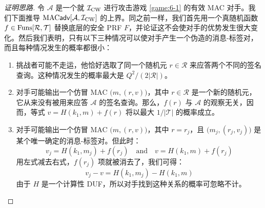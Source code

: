 \begin{proof}[证明思路]
令 $\mathcal{A}$ 是一个就 $\mathcal{I}_{\rm CW}$ 进行攻击游戏 \ref{game:6-1} 的有效 MAC 对手。我们下面推导 ${\rm MAC}\mathsf{adv}[\mathcal{A},\mathcal{I}_{\rm CW}]$ 的上界。同之前一样，我们首先用一个真随机函数 $f\in{\rm Funs}[\mathcal{R},\mathcal{T}]$ 替换底层的安全 PRF $F$，并论证这不会使对手的优势发生很大变化。然后我们表明，只有以下三种情况可以使对手产生一个伪造的消息-标签对，而且每种情况发生的概率都很小：
\begin{enumerate}
	\item 挑战者可能不走运，他恰好选取了同一个随机元 $r\in\mathcal{R}$ 来应答两个不同的签名查询。这种情况发生的概率最大是 ${Q^2}/{(2|\mathcal{R}|)}$。
	\item 对手可能输出一个仿冒 MAC $\big(m,(r,v)\big)$，其中 $r\in\mathcal{R}$ 是一个新的随机元，它从来没有被用来应答 $\mathcal{A}$ 的签名查询。那么，$f(r)$ 与 $\mathcal{A}$ 的观察无关，因而，等式 $v=H(k_1,m)+f(r)$ 将以最大 $1/|\mathcal{T}|$ 的概率成立。
	\item 对手可能输出一个仿冒 MAC $\big(m,(r,v)\big)$，其中 $r=r_j$，且 $\big(m_j,(r_j,v_j)\big)$ 是某个唯一确定的消息-标签对。但此时：
	\[
	v_j=H(k_1,m_j)+f(r_j)
	\quad\text{and}\quad
    v=H(k_1,m)+f(r_j)
    \]
    用左式减去右式，$f(r_j)$ 项就被消去了，我们可得：
    \[
    v_j-v=H(k_1,m_j)-H(k_1,m)
    \]
    由于 $H$ 是一个计算性 DUF，所以对手找到这种关系的概率可忽略不计。\qedhere
\end{enumerate}
\end{proof}
    
